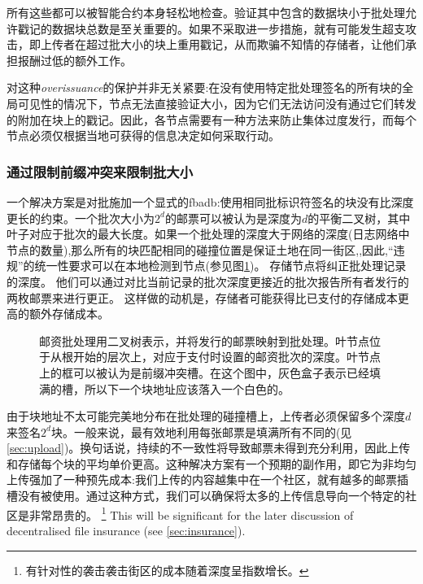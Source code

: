 所有这些都可以被智能合约本身轻松地检查。验证其中包含的数据块小于批处理允许戳记的数据块总数是至关重要的。如果不采取进一步措施，就有可能发生超支攻击，即上传者在超过批大小的块上重用戳记，从而欺骗不知情的存储者，让他们承担报酬过低的额外工作。

对这种\emph{overissuance}的保护并非无关紧要:在没有使用特定批处理签名的所有块的全局可见性的情况下，节点无法直接验证大小，因为它们无法访问没有通过它们转发的附加在块上的戳记。因此，各节点需要有一种方法来防止集体过度发行，而每个节点必须仅根据当地可获得的信息决定如何采取行动。

\subsubsection{通过限制前缀冲突来限制批大小}

一个解决方案是对批施加一个显式的fbadb:使用相同批标识符签名的块没有比深度更长的约束。一个批次大小为$2^d$的邮票可以被认为是深度为$d$的平衡二叉树，其中叶子对应于批次的最大长度。如果一个批处理的深度大于网络的深度(日志网络中节点的数量),那么所有的块匹配相同的碰撞位置是保证土地在同一街区,,因此,“违规”的统一性要求可以在本地检测到节点(参见图\ref{fig:prefix-collision})。 
存储节点将纠正批处理记录的深度。
他们可以通过对比当前记录的批次深度更接近的批次报告所有者发行的两枚邮票来进行更正。
这样做的动机是，存储者可能获得比已支付的存储成本更高的额外存储成本。


\begin{figure}[htbp]
  \centering
   \caption[限制邮票大小\statusgreen]{邮资批处理用二叉树表示，并将发行的邮票映射到批处理。叶节点位于从根开始的层次上，对应于支付时设置的邮资批次的深度。叶节点上的框可以被认为是前缀冲突槽。在这个图中，灰色盒子表示已经填满的槽，所以下一个块地址应该落入一个白色的。}
  \label{fig:prefix-collision}
\end{figure}


由于块地址不太可能完美地分布在批处理的碰撞槽上，上传者必须保留多个深度$d$来签名$2^d$块。一般来说，最有效地利用每张邮票是填满所有不同的(见\ref{sec:upload})。换句话说，持续的不一致性将导致邮票未得到充分利用，因此上传和存储每个块的平均单价更高。这种解决方案有一个预期的副作用，即它为非均匀上传强加了一种预先成本:我们上传的内容越集中在一个社区，就有越多的邮票插槽没有被使用。通过这种方式，我们可以确保将太多的上传信息导向一个特定的社区是非常昂贵的。%
%
\footnote{有针对性的袭击袭击街区的成本随着深度呈指数增长。}
%
This will be significant for the later discussion of decentralised file insurance (see \ref{sec:insurance}). 

